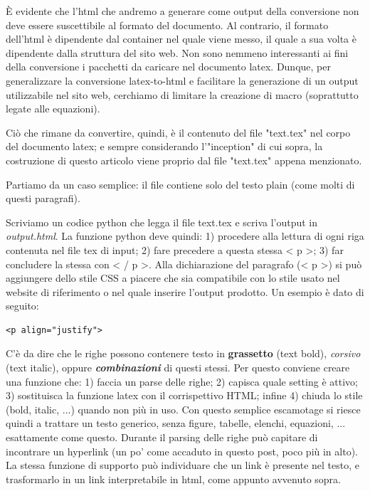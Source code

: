 È evidente che l'html che andremo a generare come output della conversione non deve essere suscettibile al formato del documento. Al contrario, il formato dell'html è dipendente dal container nel quale viene messo, il quale a sua volta è dipendente dalla struttura del sito web. Non sono nemmeno interessanti ai fini della conversione i pacchetti da caricare nel documento latex. Dunque, per generalizzare la conversione latex-to-html e facilitare la generazione di un output utilizzabile nel sito web, cerchiamo di limitare la creazione di macro (soprattutto legate alle equazioni). 

Ciò che rimane da convertire, quindi, è il contenuto del file "text.tex" nel corpo del documento latex; e sempre considerando l'"inception" di cui sopra, la costruzione di questo articolo viene proprio dal file "text.tex" appena menzionato.

Partiamo da un caso semplice: il file contiene solo del testo plain (come molti di questi paragrafi). 

Scriviamo un codice python che legga il file text.tex e scriva l'output in \textit{output.html}. La funzione python deve quindi: 1) procedere alla lettura di ogni riga contenuta nel file tex di input; 2) fare precedere a questa stessa < p >; 3) far concludere la stessa con < / p >. Alla dichiarazione del paragrafo (< p >) si può aggiungere dello stile CSS a piacere che sia compatibile con lo stile usato nel website di riferimento o nel quale inserire l'output prodotto. Un esempio è dato di seguito:

\begin{verbatim}
<p align="justify">
\end{verbatim}

C'è da dire che le righe possono contenere testo in \textbf{grassetto} (text bold), \textit{corsivo} (text italic), oppure \textbf{\textit{combinazioni}} di questi stessi. Per questo conviene creare una funzione che: 1) faccia un parse delle righe; 2) capisca quale setting è attivo; 3) sostituisca la funzione latex con il corrispettivo HTML; infine 4) chiuda lo stile (bold, italic, ...) quando non più in uso. Con questo semplice escamotage si riesce quindi a trattare un testo generico, senza figure, tabelle, elenchi, equazioni, ... esattamente come questo. Durante il parsing delle righe può capitare di incontrare un hyperlink (un po' come accaduto in questo post, poco più in alto). La stessa funzione di supporto può individuare che un link è presente nel testo, e trasformarlo in un link interpretabile in html, come appunto avvenuto sopra.

